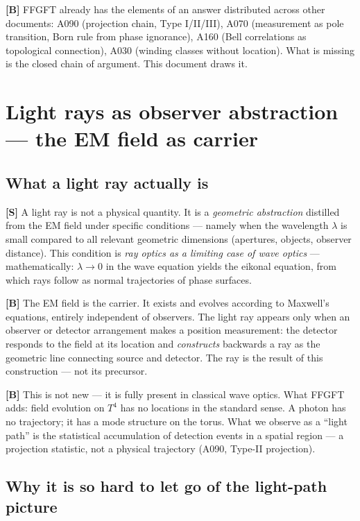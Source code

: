 \textbf{[B]} FFGFT already has the elements of an answer distributed
across other documents: A090 (projection chain, Type I/II/III), A070
(measurement as pole transition, Born rule from phase ignorance), A160
(Bell correlations as topological connection), A030 (winding classes
without location). What is missing is the closed chain of argument.
This document draws it.

\section{Light rays as observer abstraction --- the EM field as carrier}
\label{sec:lichtstrahlen}

\subsection{What a light ray actually is}

\textbf{[S]} A light ray is not a physical quantity. It is a
\emph{geometric abstraction} distilled from the EM field under specific
conditions --- namely when the wavelength $\lambda$ is small compared to
all relevant geometric dimensions (apertures, objects, observer distance).
This condition is \emph{ray optics as a limiting case of wave optics} ---
mathematically: $\lambda \to 0$ in the wave equation yields the eikonal
equation, from which rays follow as normal trajectories of phase surfaces.

\textbf{[B]} The EM field is the carrier. It exists and evolves according
to Maxwell's equations, entirely independent of observers. The light ray
appears only when an observer or detector arrangement makes a position
measurement: the detector responds to the field at its location and
\emph{constructs} backwards a ray as the geometric line connecting source
and detector. The ray is the result of this construction --- not its
precursor.

\textbf{[B]} This is not new --- it is fully present in classical wave
optics. What FFGFT adds: field evolution on $T^4$ has no locations in the
standard sense. A photon has no trajectory; it has a mode structure on the
torus. What we observe as a ``light path'' is the statistical accumulation
of detection events in a spatial region --- a projection statistic, not a
physical trajectory (A090, Type-II projection).

\subsection{Why it is so hard to let go of the light-path picture}

